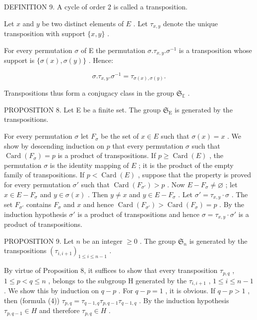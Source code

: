 DEFINITION 9. A cycle of order 2 is called a transposition.

Let \(x\) and \(y\) be two distinct elements of \(E\) . Let \(\tau_{x,y}\) denote the unique transposition with support \(\{x, y\}\) .

For every permutation \(\sigma\) of E the permutation \(\sigma. \tau_{x,y}. \sigma^{-1}\) is a transposition whose support is \(\{\sigma(x), \sigma(y)\}\) . Hence:

\[
\sigma . \tau_ {x, y}. \sigma^ {- 1} = \tau_ {\sigma (x), \sigma (y)}.\tag{4}
\]

Transpositions thus form a conjugacy class in the group \(\mathfrak{S}_{\mathbb{E}}\) .

PROPOSITION 8. Let E be a finite set. The group \(\mathfrak{S}_{\mathrm{E}}\) is generated by the transpositions.

For every permutation \(\sigma\) let \(F_{\sigma}\) be the set of \(x \in E\) such that \(\sigma(x) = x\) . We show by descending induction on \(p\) that every permutation \(\sigma\) such that \(\operatorname{Card}(F_{\sigma}) = p\) is a product of transpositions. If \(p \geqslant \operatorname{Card}(E)\) , the permutation \(\sigma\) is the identity mapping of \(E\) ; it is the product of the empty family of transpositions. If \(p < \operatorname{Card}(E)\) , suppose that the property is proved for every permutation \(\sigma'\) such that \(\operatorname{Card}(F_{\sigma'}) > p\) . Now \(E - F_{\sigma} \neq \varnothing\) ; let \(x \in E - F_{\sigma}\) and \(y \in \sigma(x)\) . Then \(y \neq x\) and \(y \in E - F_{\sigma}\) . Let \(\sigma' = \tau_{x,y} \cdot \sigma\) . The set \(F_{\sigma'}\) contains \(F_{\sigma}\) and \(x\) and hence \(\operatorname{Card}(F_{\sigma'}) > \operatorname{Card}(F_{\sigma}) = p\) . By the induction hypothesis \(\sigma'\) is a product of transpositions and hence \(\sigma = \tau_{x,y} \cdot \sigma'\) is a product of transpositions.

PROPOSITION 9. Let \(n\) be an integer \(\geqslant 0\) . The group \(\mathfrak{S}_n\) is generated by the transpositions \((\tau_{i,i+1})_{1\leqslant i\leqslant n-1}\) .

By virtue of Proposition 8, it suffices to show that every transposition \(\tau_{p,q}\) , \(1 \leqslant p < q \leqslant n\) , belongs to the subgroup H generated by the \(\tau_{i,i+1}\) , \(1 \leqslant i \leqslant n-1\) . We show this by induction on \(q-p\) . For \(q-p=1\) , it is obvious. If \(q-p>1\) , then (formula (4)) \(\tau_{p,q} = \tau_{q-1,q}\tau_{p,q-1}\tau_{q-1,q}\) . By the induction hypothesis \(\tau_{p,q-1} \in H\) and therefore \(\tau_{p,q} \in H\) .

